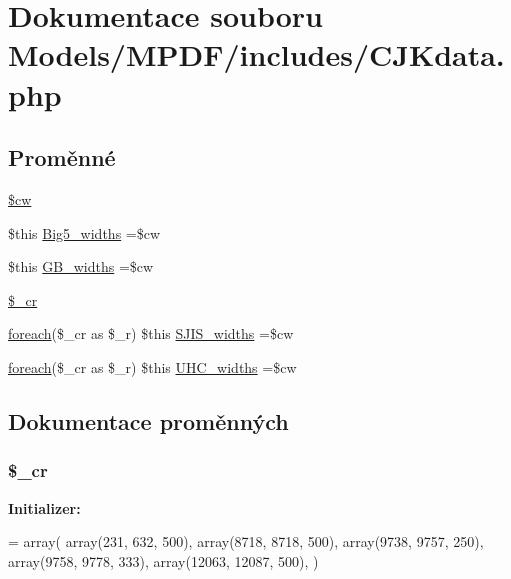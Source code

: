 \hypertarget{_c_j_kdata_8php}{\section{Dokumentace souboru Models/\-M\-P\-D\-F/includes/\-C\-J\-Kdata.php}
\label{_c_j_kdata_8php}
}
\subsection*{Proměnné}
\begin{DoxyCompactItemize}
\item 
\hyperlink{_c_j_kdata_8php_ac2951b03dbb0317e6c61ec920b7479dc}{\$cw}
\item 
\$this \hyperlink{_c_j_kdata_8php_a64801e8c1e125dfe17e10eeb51cf23f4}{Big5\-\_\-widths} =\$cw
\item 
\$this \hyperlink{_c_j_kdata_8php_abcf44baace0069f775707f1d95f592ff}{G\-B\-\_\-widths} =\$cw
\item 
\hyperlink{_c_j_kdata_8php_a707f4c2bb099e7b1e959a22ef2fa457f}{\$\-\_\-cr}
\item 
\hyperlink{font__names_8php_ac6e05d8eea8274a71f8f9c686e891421}{foreach}(\$\-\_\-cr as \$\-\_\-r) \$this \hyperlink{_c_j_kdata_8php_a1ef0218d518e6c7672576ad34542caa6}{S\-J\-I\-S\-\_\-widths} =\$cw
\item 
\hyperlink{font__names_8php_ac6e05d8eea8274a71f8f9c686e891421}{foreach}(\$\-\_\-cr as \$\-\_\-r) \$this \hyperlink{_c_j_kdata_8php_a78c7553fbdb5c73294b1b4f24193b9bd}{U\-H\-C\-\_\-widths} =\$cw
\end{DoxyCompactItemize}


\subsection{Dokumentace proměnných}
\hypertarget{_c_j_kdata_8php_a707f4c2bb099e7b1e959a22ef2fa457f}{
\subsubsection[{\$\-\_\-cr}]{\setlength{\rightskip}{0pt plus 5cm}\$\-\_\-cr}}\label{_c_j_kdata_8php_a707f4c2bb099e7b1e959a22ef2fa457f}
{\bfseries Initializer\-:}
\begin{DoxyCode}
= array(
    array(231, 632, 500), 
    array(8718, 8718, 500),
    array(9738, 9757, 250), 
    array(9758, 9778, 333), 
    array(12063, 12087, 500),
)
\end{DoxyCode}


